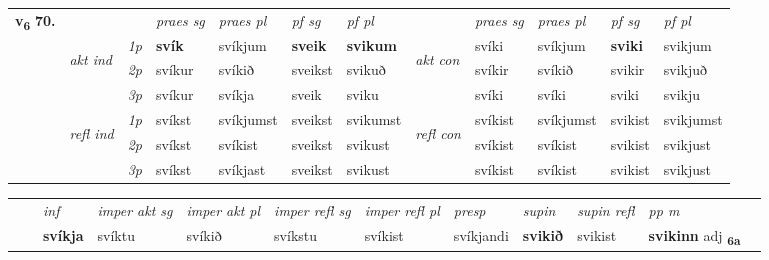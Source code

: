 \begin{tabular}{llllllllllll} \toprule
\multirow{4}{*}{{{\textbf{v{\textsubscript{6}}} \Large{\textbf{70.}}}}}  & &   &  \textit{praes sg}  & \textit{praes pl}  &\textit{ pf sg} & \textit{pf pl} &  &  \textit{praes sg}  & \textit{praes pl}  & \textit{pf sg} & \textit{pf pl } \\*
	\cmidrule{4-7} \cmidrule{9-12}
 & \multirow{3}{*}{\begin{turn}{90}\textit{akt ind}\end{turn}} & {\textit{1p}} & \textbf{svík} & svíkjum    & \textbf{sveik} & \textbf{svikum} & \multirow{3}{*}{\begin{turn}{90}\textit{akt con}\end{turn}} &svíki & svíkjum & \textbf{sviki} & svikjum\\*
& &  {\textit{2p}} &  svíkur  & svíkið   & sveikst & svikuð & & svíkir & svíkið & svikir & svikjuð \\*
& &  {\textit{3p}} & svíkur & svíkja   & sveik & sviku & & svíki & svíki& sviki & svikju  \\*
\cmidrule{4-7} \cmidrule{9-12}
 &\multirow{3}{*}{\begin{turn}{90}\textit{refl ind}\end{turn}} & {\textit{1p}} & svíkst & svíkjumst    & sveikst & svikumst & \multirow{3}{*}{\begin{turn}{90}\textit{refl con}\end{turn}}  &svíkist & svíkjumst & svikist & svikjumst\\*
 &&  {\textit{2p}} &  svíkst  & svíkist   & sveikst & svikust & &svíkist & svíkist & svikist & svikjust \\*
& &  {\textit{3p}} & svíkst & svíkjast   & sveikst & svikust & & svíkist & svíkist& svikist & svikjust  \\*
\cmidrule{4-7} \cmidrule{9-12}
\end{tabular}


\begin{tabular}{llllllllllll}
 & & \textit{inf} & \textit{imper akt sg} & \textit{imper akt pl} & \textit{imper refl sg} & \textit{imper refl pl} & \textit{presp} & \textit{supin} & \textit{supin refl} & \textit{pp m}     \\*
  & & \textbf{svíkja} & svíktu  & svíkið & svíkstu & svíkist & svíkjandi &  \textbf{svikið} & svikist & \textbf{svikinn} adj \textbf{\textsubscript{6a}} \\*
\cmidrule{1-12}
\end{tabular}



